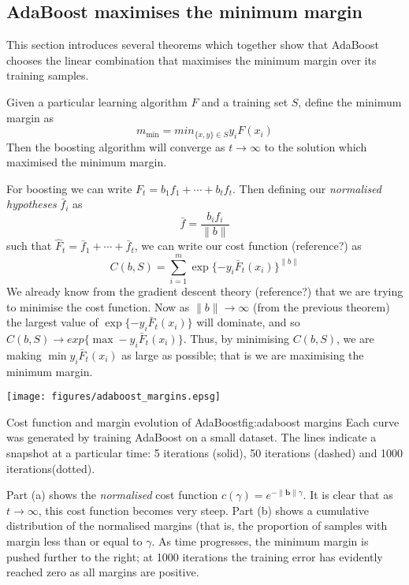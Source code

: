 \subsection{AdaBoost maximises the minimum margin}

This section introduces several theorems which together show that
AdaBoost chooses the linear combination that maximises the minimum
margin over its training samples.

\begin{theorem}
Given a particular learning algorithm $F$ and a training
set $S$, define the minimum margin as
\[
m_{\min} = min_{\{x,y\} \in S} y_i F(x_i)
\]
Then the boosting algorithm will converge as $t \rightarrow \infty$ to
the solution which maximised the minimum margin.

\proof For boosting we can write $F_t = b_1 f_1 + \cdots + b_t f_t$.
Then defining our \emph{normalised hypotheses} $\bar{f}_i$ as
\[
\bar{f} = \frac{b_i f_i}{\|b\|}
\]
such that $\hat{F}_t = \bar{f}_1 + \cdots + \bar{f}_t$, we can write
our cost function (reference?) as 
\[
C(b, S) = \sum_{i=1}^{m} \exp\{-y_i \bar{F}_t(x_i)\}^{\|b\|}
\]
We already know from the gradient descent theory (reference?) that we
are trying to minimise the cost function.  Now as $\|b\| \rightarrow
\infty$ (from the previous theorem) the largest value of $\exp\{-y_i
\bar{F}_t(x_i)\}$ will dominate, and so $C(b, S) \rightarrow exp\{\max
-y_i \bar{F}_t(x_i)\}$.  Thus, by minimising $C(b, S)$, we are making
$\min y_i \bar{F}_t(x_i)$ as large as possible; that is we are
maximising the minimum margin.
\end{theorem}


\begin{linefigure}
\begin{center}
\texttt{[image: figures/adaboost\_margins.epsg]}
\end{center}
\begin{capt}{Cost function and margin evolution of
AdaBoost}{fig:adaboost margins}
Each curve was generated by training AdaBoost on a small dataset.  The
lines indicate a snapshot at a particular time: 5 iterations (solid),
50 iterations (dashed) and 1000 iterations(dotted).

Part (a) shows the \emph{normalised} cost function $c(\gamma) =
e^{-\|\mathbf{b}\| \gamma}$.  It is clear that as $t \rightarrow \infty$,
this cost function becomes very steep.  Part (b) shows a cumulative
distribution of the normalised margins (that is, the proportion of
samples with margin less than or equal to $\gamma$.  As time
progresses, the minimum margin is pushed further to the right; at 1000
iterations the training error has evidently reached zero as all
margins are positive.
\end{capt}
\end{linefigure}




